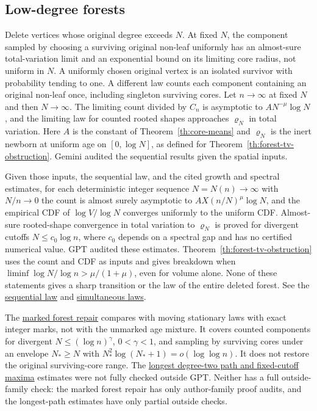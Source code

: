\documentclass[11pt]{article}
\newcommand{\proofsrc}[2]{\href{https://github.com/uzay-eth/friend-tree-exponent/blob/a0972085ad72ad5685ae7b424988648d1965e73c/#1}{#2}}
\theoremstyle{remark}
\numberwithin{equation}{section}
\begin{document}
\subsection{Low-degree forests}
Delete vertices whose original degree exceeds $N$. At fixed $N$, the component sampled by choosing a surviving original non-leaf uniformly has an almost-sure total-variation limit and an exponential bound on its limiting core radius, not uniform in $N$. A uniformly chosen original vertex is an isolated survivor with probability tending to one. A different law counts each component containing an original non-leaf once, including singleton surviving cores. Let $n\to\infty$ at fixed $N$ and then $N\to\infty$. The limiting count divided by $C_n$ is asymptotic to $AN^{-\mu}\log N$, and the limiting law for counted rooted shapes approaches $\varrho_N$ in total variation. Here $A$ is the constant of Theorem~\ref{th:core-means} and $\varrho_N$ is the inert newborn at uniform age on $[0,\log N]$, as defined for Theorem~\ref{th:forest-tv-obstruction}. Gemini audited the sequential results given the spatial inputs.

Given those inputs, the sequential law, and the cited growth and spectral estimates, for each deterministic integer sequence $N=N(n)\to\infty$ with $N/n\to0$ the count is almost surely asymptotic to $AX(n/N)^\mu\log N$, and the empirical CDF of $\log V/\log N$ converges uniformly to the uniform CDF. Almost-sure rooted-shape convergence in total variation to $\varrho_N$ is proved for divergent cutoffs $N\le c_0\log n$, where $c_0$ depends on a spectral gap and has no certified numerical value. GPT audited these estimates. Theorem~\ref{th:forest-tv-obstruction} uses the count and CDF as inputs and gives breakdown when $\liminf \log N/\log n>\mu/(1+\mu)$, even for volume alone. None of these statements gives a sharp transition or the law of the entire deleted forest. See the \proofsrc{round2/proofs/astra-late/source/round2/open/forest-age/README.md}{sequential law} and \proofsrc{round2/proofs/neon2/q5/README.md}{simultaneous laws}.

The \proofsrc{round2/proofs/astra-late/source/round2/open/low-forest/marked-repair/README.md}{marked forest repair} compares with moving stationary laws with exact integer marks, not with the unmarked age mixture. It covers counted components for divergent $N\le(\log n)^\gamma$, $0<\gamma<1$, and sampling by surviving cores under an envelope $N_*\ge N$ with $N_*^2\log(N_*+1)=o(\log\log n)$. It does not restore the original surviving-core range. The \proofsrc{round2/proofs/fable/newground/q5-low-degree-forest/longest-path/REPORT.md}{longest degree-two path and fixed-cutoff maxima} estimates were not fully checked outside GPT. Neither has a full outside-family check: the marked forest repair has only author-family proof audits, and the longest-path estimates have only partial outside checks.
\end{document}
